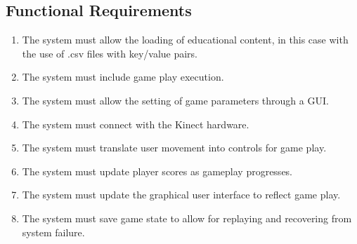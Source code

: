 \subsection{Functional Requirements}

\begin{enumerate}
	\item The system must allow the loading of educational content, in this case with the use of .csv files with key/value pairs.
	\item The system must include game play execution.
	\item The system must allow the setting of game parameters through a GUI.
	\item The system must connect with the Kinect hardware.
	\item The system must translate user movement into controls for game play.
	\item The system must update player scores as gameplay progresses.
	\item The system must update the graphical user interface to reflect game play.
	\item The system must save game state to allow for replaying and recovering from system failure.
\end{enumerate}